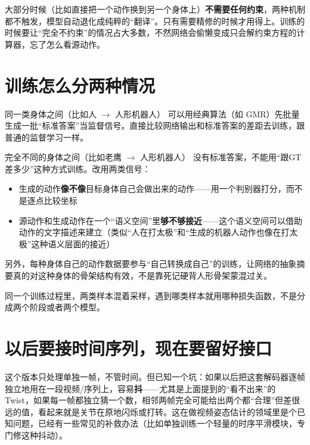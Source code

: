 \documentclass[11pt,a4paper]{ctexart}
\begin{document}
大部分时候（比如直接把一个动作换到另一个身体上）\textbf{不需要任何约束}，两种机制都不触发，模型自动退化成纯粹的“翻译”。只有需要精修的时候才用得上。训练的时候要让“完全不约束”的情况占大多数，不然网络会偷懒变成只会解约束方程的计算器，忘了怎么看源动作。

\section{训练怎么分两种情况}

\begin{ideabox}{同一类身体之间（比如人 $\to$ 人形机器人）}
可以用经典算法（如 GMR）先批量生成一批“标准答案”当监督信号。直接比较网络输出和标准答案的差距去训练，跟普通的监督学习一样。
\end{ideabox}

\begin{ideabox}{完全不同的身体之间（比如老鹰 $\to$ 人形机器人）}
没有标准答案，不能用“跟GT差多少”这种方式训练。改用两类信号：
\begin{itemize}
    \item 生成的动作\textbf{像不像}目标身体自己会做出来的动作——用一个判别器打分，而不是逐点比较坐标
    \item 源动作和生成动作在一个“语义空间”里\textbf{够不够接近}——这个语义空间可以借助动作的文字描述来建立（类似“人在打太极”和“生成的机器人动作也像在打太极”这种语义层面的接近）
\end{itemize}
另外，每种身体自己的动作数据要参与“自己转换成自己”的训练，让网络的抽象摘要真的对这种身体的骨架结构有效，不是靠死记硬背人形骨架蒙混过关。
\end{ideabox}

同一个训练过程里，两类样本混着采样，遇到哪类样本就用哪种损失函数，不是分成两个阶段或者两个模型。

\section{以后要接时间序列，现在要留好接口}

这个版本只处理单独一帧，不管时间。但已知一个坑：如果以后把这套解码器逐帧独立地用在一段视频/序列上，容易\textbf{抖}——尤其是上面提到的“看不出来”的 Twist，如果每一帧都独立猜一个数，相邻两帧完全可能给出两个都“合理”但差很远的值，看起来就是关节在原地闪烁或打转。这在做视频姿态估计的领域里是个已知问题，已经有一些常见的补救办法（比如单独训练一个轻量的时序平滑模块，专门修这种抖动）。
\end{document}

